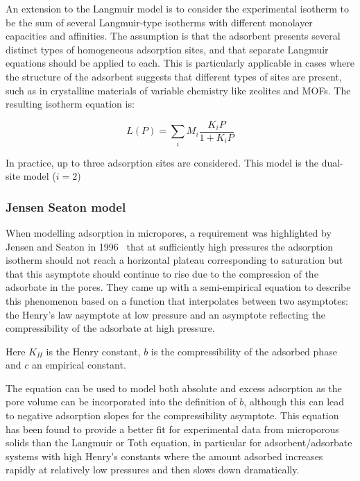 An extension to the Langmuir model is to consider the experimental isotherm to be
the sum of several Langmuir-type isotherms with different monolayer capacities and affinities.
The assumption is that the adsorbent presents several distinct types of homogeneous adsorption
sites, and that separate Langmuir equations should be applied to each. This is particularly
applicable in cases where the structure of the adsorbent suggests that different types of
sites are present, such as in crystalline materials of variable chemistry like zeolites and MOFs.
The resulting isotherm equation is:

\begin{equation}
    L(P) = \sum_i M_i\frac{K_i P}{1+K_i P}
\end{equation}

In practice, up to three adsorption sites are considered.
This model is the dual-site model (\(i=2\))

\subsubsection{Jensen Seaton model}

When modelling adsorption in micropores, a requirement was highlighted by
Jensen and Seaton in 1996~\cite{jensenIsothermEquationAdsorption1996} 
that at sufficiently high pressures the adsorption
isotherm should not reach a horizontal plateau corresponding to saturation but
that this asymptote should continue to rise due to the compression of the adsorbate
in the pores. They came up with a semi-empirical equation to describe this phenomenon
based on a function that interpolates between two asymptotes: the Henry’s law asymptote
at low pressure and an asymptote reflecting the compressibility of the adsorbate at
high pressure.

Here \(K_H\) is the Henry constant, \(b\) is the compressibility of the
adsorbed phase and \(c\) an empirical constant.

The equation can be used to model both absolute and excess adsorption as the pore
volume can be incorporated into the definition of \(b\), although this can lead
to negative adsorption slopes for the compressibility asymptote.
This equation has been found to provide a better fit for experimental data
from microporous solids than the Langmuir or Toth equation, in particular for
adsorbent/adsorbate systems with high Henry’s constants where the amount adsorbed
increases rapidly at relatively low pressures and then slows down dramatically.

